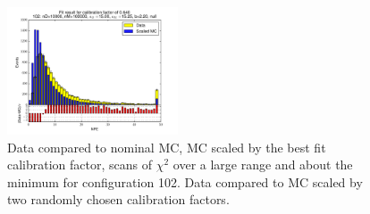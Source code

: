 \begin{figure}[htbp]
\begin{center}
\includegraphics[width=0.45\textwidth]{../FIGURES/102/FIG_Fit_result_for_calibration_factor_of_0_640.pdf} 
\caption{Data compared to nominal MC, MC scaled by the best fit calibration factor, scans of $\chi^2$ over a large range and about the minimum for configuration 102. Data compared to MC scaled by two randomly chosen calibration factors.} 
\label{tab:best_102} 
\end{center} \end{figure} 

